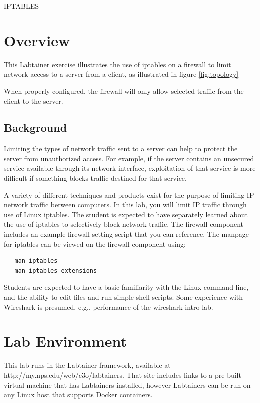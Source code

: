 


\begin{center}
{\LARGE IPTABLES}
\vspace{0.1in}\\
\end{center}


\section{Overview}
This Labtainer exercise illustrates the use of iptables
on a firewall to limit network access to a server from a client,
as illustrated in figure 
\ref{fig:topology}

When properly configured, the firewall will only allow selected
traffic from the client to the server.

\subsection {Background}
Limiting the types of network traffic sent to a server can help to
protect the server from unauthorized access.  For example, if the
server contains an unsecured service available through its network
interface, exploitation of that service is more difficult if something
blocks traffic destined for that service.

A variety of different techniques and products exist for the purpose of limiting
IP network traffic between computers.  In this lab, you will limit IP traffic through
use of Linux iptables.  
The student is expected to have separately learned about the use of iptables
to selectively block network traffic. The firewall component includes an
example firewall setting script that you can reference.  The manpage for iptables can be viewed on the
firewall component using:
\begin{verbatim}
   man iptables
   man iptables-extensions
\end{verbatim}

Students are expected to have a basic 
familiarity with the Linux command line, and the ability to edit files and
run simple shell scripts. Some experience with Wireshark is presumed, e.g., performance of
the wireshark-intro lab.

\section{Lab Environment}
This lab runs in the Labtainer framework,
available at http://my.nps.edu/web/c3o/labtainers.
That site includes links to a pre-built virtual machine
that has Labtainers installed, however Labtainers can
be run on any Linux host that supports Docker containers.

